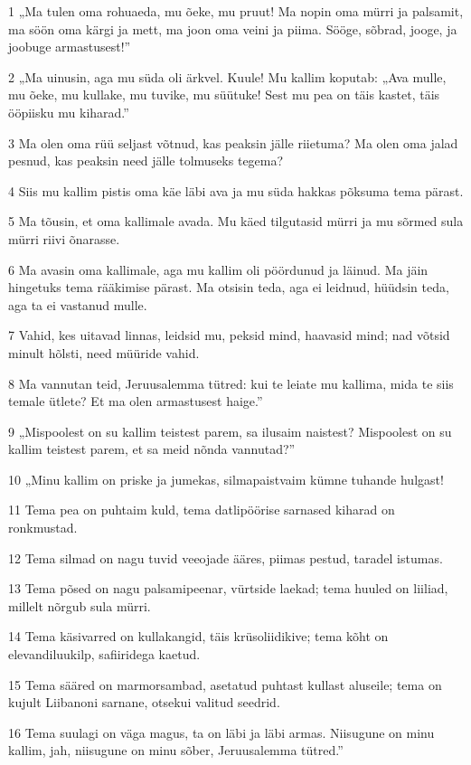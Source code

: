 \par 1 „Ma tulen oma rohuaeda, mu õeke, mu pruut! Ma nopin oma mürri ja palsamit, ma söön oma kärgi ja mett, ma joon oma veini ja piima. Sööge, sõbrad, jooge, ja joobuge armastusest!”
\par 2 „Ma uinusin, aga mu süda oli ärkvel. Kuule! Mu kallim koputab: „Ava mulle, mu õeke, mu kullake, mu tuvike, mu süütuke! Sest mu pea on täis kastet, täis ööpiisku mu kiharad.”
\par 3 Ma olen oma rüü seljast võtnud, kas peaksin jälle riietuma? Ma olen oma jalad pesnud, kas peaksin need jälle tolmuseks tegema?
\par 4 Siis mu kallim pistis oma käe läbi ava ja mu süda hakkas põksuma tema pärast.
\par 5 Ma tõusin, et oma kallimale avada. Mu käed tilgutasid mürri ja mu sõrmed sula mürri riivi õnarasse.
\par 6 Ma avasin oma kallimale, aga mu kallim oli pöördunud ja läinud. Ma jäin hingetuks tema rääkimise pärast. Ma otsisin teda, aga ei leidnud, hüüdsin teda, aga ta ei vastanud mulle.
\par 7 Vahid, kes uitavad linnas, leidsid mu, peksid mind, haavasid mind; nad võtsid minult hõlsti, need müüride vahid.
\par 8 Ma vannutan teid, Jeruusalemma tütred: kui te leiate mu kallima, mida te siis temale ütlete? Et ma olen armastusest haige.”
\par 9 „Mispoolest on su kallim teistest parem, sa ilusaim naistest? Mispoolest on su kallim teistest parem, et sa meid nõnda vannutad?”
\par 10 „Minu kallim on priske ja jumekas, silmapaistvaim kümne tuhande hulgast!
\par 11 Tema pea on puhtaim kuld, tema datlipöörise sarnased kiharad on ronkmustad.
\par 12 Tema silmad on nagu tuvid veeojade ääres, piimas pestud, taradel istumas.
\par 13 Tema põsed on nagu palsamipeenar, vürtside laekad; tema huuled on liiliad, millelt nõrgub sula mürri.
\par 14 Tema käsivarred on kullakangid, täis krüsoliidikive; tema kõht on elevandiluukilp, safiiridega kaetud.
\par 15 Tema sääred on marmorsambad, asetatud puhtast kullast aluseile; tema on kujult Liibanoni sarnane, otsekui valitud seedrid.
\par 16 Tema suulagi on väga magus, ta on läbi ja läbi armas. Niisugune on minu kallim, jah, niisugune on minu sõber, Jeruusalemma tütred.”

